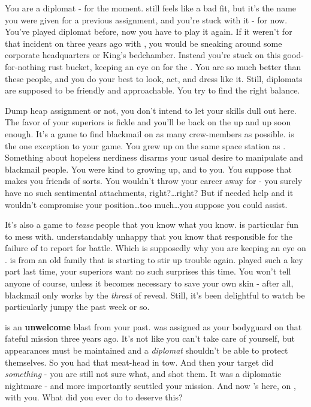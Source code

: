 \documentclass[char]{TMFHope}
\begin{document}
\name{\cDip{}}

You are a diplomat - for the moment. \cDip{\full} still feels like a bad fit, but it's the name you were given for a previous assignment, and you're stuck with it - for now. You've played diplomat before, now you have to play it again. If it weren't for that incident on \pHome{} three years ago with \cWeap{\full}, you would be sneaking around some corporate headquarters or King's bedchamber. Instead you're stuck on this good-for-nothing rust bucket, keeping an eye on \cXO{\full} for the \pPlan{}. You are so much better than these people, and you do your best to look, act, and dress like it. Still, diplomats are supposed to be friendly and approachable. You try to find the right balance.

Dump heap assignment or not, you don't intend to let your skills dull out here. The favor of your superiors is fickle and you'll be back on the up and up soon enough. It's a game to find blackmail on as many crew-members as possible. \cMed{\full} is the one exception to your game. You grew up on the same space station as \cMed{\them}. Something about \cMed{\their} hopeless nerdiness disarms your usual desire to manipulate and blackmail people. You were kind to \cMed{\them} growing up, and \cMed{\they} to you. You suppose that makes you friends of sorts. You wouldn't throw your career away for \cMed{\them} - you surely have no such sentimental attachments, right?\ldots right? But if \cMed{} needed help and it wouldn't compromise your position\ldots too much\ldots you suppose you could assist.

It's also a game to \emph{tease} people that you know what you know. \cXO{} is particular fun to mess with. \cXO{\They} \cXO{\are} understandably unhappy that you know that \cXO{\they} \cXO{\are} responsible for the failure of \pOld{} to report for battle. Which is supposedly why you are keeping an eye on \cXO{\them}. \cXO{} is from an old \pEdge{} family that is starting to stir up trouble again. \cXO{\They} played such a key part last time, your superiors want no such surprises this time. You won't tell anyone of course, unless it becomes necessary to save your own skin - after all, blackmail only works by the \emph{threat} of reveal. Still, it's been delightful to watch \cXO{} be particularly jumpy the past week or so. 

\cWeap{} is an {\bf unwelcome} blast from your past. \cWeap{} was assigned as your bodyguard on that fateful mission three years ago. It's not like you can't take care of yourself, but appearances must be maintained and a \emph{diplomat} shouldn't be able to protect themselves. So you had that meat-head in tow. And then your target did \emph{something} - you are still not sure what, and \cWeap{} shot them. It was a diplomatic nightmare - and more importantly scuttled your mission. And now \cWeap{\they}'s here, on \pNew{}, with you. What did you ever do to deserve this?
\end{document}
